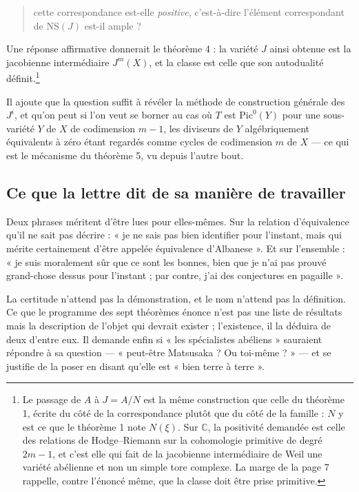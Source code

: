 \documentclass[11pt,a4paper]{article}
\begin{document}
\begin{quote}
cette correspondance est-elle \emph{positive}, c'est-à-dire l'élément
correspondant de $\mathrm{NS}(J)$ est-il ample ?
\end{quote}

Une réponse affirmative donnerait le théorème 4 : la variété $J$ ainsi obtenue
est la jacobienne intermédiaire $J^{m}(X)$, et la classe est celle que son
autodualité définit.\footnote{Le passage de $A$ à $J=A/N$ est la même
construction que celle du théorème 1, écrite du côté de la correspondance
plutôt que du côté de la famille : $N$ y est ce que le théorème 1 note
$N(\xi)$. Sur $\mathbb{C}$, la positivité demandée est celle des relations de
Hodge--Riemann sur la cohomologie primitive de degré $2m-1$, et c'est elle qui
fait de la jacobienne intermédiaire de Weil une variété abélienne et non un
simple tore complexe. La marge de la page 7 rappelle, contre l'énoncé même, que
la classe doit être prise primitive.}

Il ajoute que la question suffit à révéler la méthode de construction générale
des $J^{i}$, et qu'on peut si l'on veut se borner au cas où $T$ est
$\mathrm{Pic}^{0}(Y)$ pour une sous-variété $Y$ de $X$ de codimension $m-1$,
les diviseurs de $Y$ algébriquement équivalents à zéro étant regardés comme
cycles de codimension $m$ de $X$ — ce qui est le mécanisme du théorème 5, vu
depuis l'autre bout.

\subsection*{Ce que la lettre dit de sa manière de travailler}

Deux phrases méritent d'être lues pour elles-mêmes. Sur la relation
d'équivalence qu'il ne sait pas décrire : « je ne sais pas bien identifier pour
l'instant, mais qui mérite certainement d'être appelée équivalence
d'Albanese ». Et sur l'ensemble : « je suis moralement sûr que ce sont les
bonnes, bien que je n'ai pas prouvé grand-chose dessus pour l'instant ; par
contre, j'ai des conjectures en pagaille ».

La certitude n'attend pas la démonstration, et le nom n'attend pas la
définition. Ce que le programme des sept théorèmes énonce n'est pas une liste de
résultats mais la description de l'objet qui devrait exister ; l'existence, il
la déduira de deux d'entre eux. Il demande enfin si « les spécialistes
abéliens » sauraient répondre à sa question — « peut-être Matsusaka ? Ou
toi-même ? » — et se justifie de la poser en disant qu'elle est « bien terre à
terre ».
\end{document}
